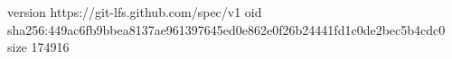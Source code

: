 version https://git-lfs.github.com/spec/v1
oid sha256:449ac6fb9bbea8137ae961397645ed0e862e0f26b24441fd1c0de2bec5b4cdc0
size 174916
